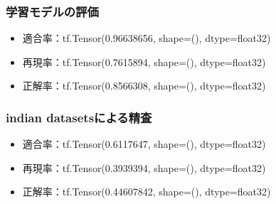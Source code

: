 \documentclass[a4paper, 11pt, titlepage]{jsarticle}
\begin{document}
\subsubsection{学習モデルの評価}
\begin{itemize}
\item 適合率：tf.Tensor(0.96638656, shape=(), dtype=float32)
\item 再現率：tf.Tensor(0.7615894, shape=(), dtype=float32) 
\item 正解率：tf.Tensor(0.8566308, shape=(), dtype=float32)
\end{itemize}
\subsubsection{indian datasetsによる精査}
\begin{itemize}
\item 適合率：tf.Tensor(0.6117647, shape=(), dtype=float32)
\item 再現率：tf.Tensor(0.3939394, shape=(), dtype=float32) 
\item 正解率：tf.Tensor(0.44607842, shape=(), dtype=float32)
\end{itemize}
\end{document}
